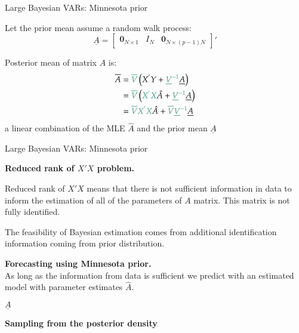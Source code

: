 \documentclass[notes,blackandwhite,mathsans,usenames,dvipsnames]{beamer}
\begin{document}
\begin{frame}{Large Bayesian VARs: Minnesota prior}

{\color{mcxs2}Let the prior mean assume a random walk process:} 
$$\underline{A}=\begin{bmatrix} \mathbf{0}_{N\times1} & I_N & \mathbf{0}_{N\times(p-1)N}\end{bmatrix}'$$

{\color{mcxs2}Posterior mean of matrix} $A$ {\color{mcxs2}is:}
\begin{align*}
\overline{A} &= {\color{mcxs2}\overline{V}}\left( X^{'}Y + {\color{mcxs2}\underline{V}^{-1}}\underline{A} \right)\\ 
&= {\color{mcxs2}\overline{V}}\left( {\color{mcxs2}X^{'}X}\hat{A} + {\color{mcxs2}\underline{V}^{-1}}\underline{A} \right)\\ 
&= {\color{mcxs2}\overline{V} X^{'}X}\hat{A} + {\color{mcxs2}\overline{V}\underline{V}^{-1}}\underline{A} 
\end{align*}
{\color{mcxs2}a linear combination of the MLE} $\hat{A}$ {\color{mcxs2}and the prior mean} $\underline{A}$

\end{frame}



\begin{frame}{Large Bayesian VARs: Minnesota prior}

\bigskip\textbf{Reduced rank of $X'X$ problem.}\\
{\color{mcxs2}Reduced rank of $X'X$ means that there is not sufficient information in data to inform the estimation of all of the parameters of $A$ matrix. This matrix is not fully identified.

\smallskip The feasibility of Bayesian estimation comes from additional identification information coming from prior distribution.}


\bigskip\textbf{Forecasting using Minnesota prior.}\\
{\color{mcxs2}As long as the information from data is sufficient we predict with an estimated model with parameter estimates} $\hat{A}$.

 $\underline{A}$
\end{frame}







{
\begin{frame}

\begin{adjustwidth}{-0.5cm}{0cm}
\vspace{8.3cm}\Large
\textbf{{\color{mcxs1}Sampling from} {\color{mcxs5}the posterior density}}
\end{adjustwidth}

\end{frame}
}
\end{document}
